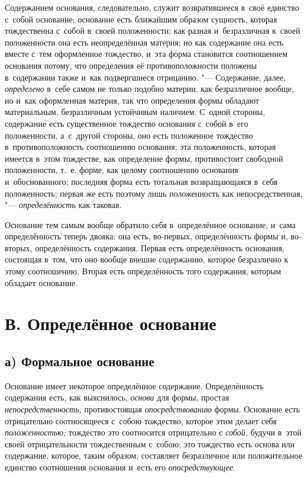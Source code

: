 Содержанием основания, следовательно, служит возвратившееся в~своё единство
с~собой основание; основание есть ближайшим образом сущность, которая
тождественна с~собой в~своей положенности; как разная и~безразличная к~своей
положенности она есть неопределённая материя; но как содержание она есть вместе
с~тем оформленное тождество, и~эта форма становится соотношением основания
потому, что определения её противоположности положены в~содержании также и~как
подвергшиеся отрицанию. "--- Содержание, далее, {\em определено} в~себе самом
не только подобно материи, как безразличное вообще, но и~как оформленная
материя, так что определения формы обладают материальным, безразличным
устойчивым наличием. С~одной стороны, содержание есть существенное тождество
основания с~собой в~его положенности, а~с~другой стороны, оно есть положенное
тождество в~противоположность соотношению основания; эта положенность, которая
имеется в~этом тождестве, как определение формы, противостоит свободной
положенности, т.~е. форме, как целому соотношению основания и~обоснованного;
последняя форма есть тотальная возвращающаяся в~себя положенность; первая же
есть поэтому лишь положенность как непосредственная, "--- {\em определённость}
как таковая.

Основание тем самым вообще обратило себя в~определённое основание, и~сама
определённость теперь двояка: она есть, во-первых, определённость формы и,
во-вторых, определённость содержания. Первая есть определённость основания,
состоящая в~том, что оно вообще внешне содержанию, которое безразлично к
этому соотношению. Вторая есть определённость того содержания, которым
обладает основание.


\section[В. Определённое основание]{В. Определённое основание}

\subsection[а) Формальное основание]{а) Формальное основание}

Основание имеет некоторое определённое содержание. Определённость содержания
есть, как выяснилось, {\em основа} для формы, простая {\em непосредственность,}
противостоящая {\em опосредствованию} формы. Основание есть отрицательно
соотносящееся с~собою тождество, которое этим делает себя {\em положенностью;}
тождество это соотносится отрицательно с {\em собой,} будучи в~этой своей
отрицательности тождественным с~собою; это тождество есть основа или
содержание, которое, таким образом, составляет безразличное или положительное
единство соотношения основания и~есть его {\em опосредствующее}.

